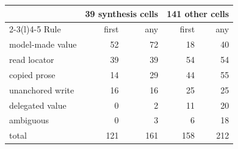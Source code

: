 \begin{tabular}{@{}lrrrr@{}}
\toprule
 & \multicolumn{2}{c}{39 synthesis cells} & \multicolumn{2}{c}{141 other cells} \\
\cmidrule(lr){2-3}\cmidrule(l){4-5}
Rule & first & any & first & any \\
\midrule
model-made value & 52 & 72 & 18 & 40 \\
read locator & 39 & 39 & 54 & 54 \\
copied prose & 14 & 29 & 44 & 55 \\
unanchored write & 16 & 16 & 25 & 25 \\
delegated value & 0 & 2 & 11 & 20 \\
ambiguous & 0 & 3 & 6 & 18 \\
\midrule
total & 121 & 161 & 158 & 212 \\
\bottomrule
\end{tabular}
